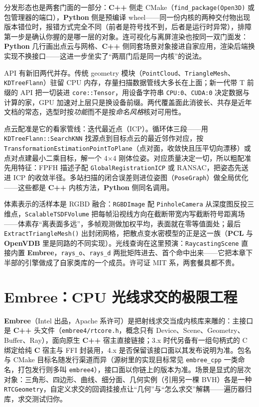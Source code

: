 \documentclass[12pt,a4paper,fontset=fandol]{ctexbook}
\newcommand{\Fn}[1]{\texttt{#1()}}
\newcommand{\Tp}[1]{\texttt{#1}}
\newcommand{\Bk}{\allowbreak}
\newcommand{\Lib}[1]{\textbf{#1}}
\newcommand{\Lang}[1]{\textsf{\bfseries #1}}
\newcommand{\CL}{\Lang{C}}
\newcommand{\CPP}{\Lang{C++}}
\newcommand{\PY}{\Lang{Python}}
\begin{document}
分发形态也是两套门面的一部分：\CPP{} 侧走 CMake（\Tp{find\_package(Open3D)} 或包管理器的端口），\PY{} 侧是预编译 wheel——同一份内核的两种交付物出现版本错位时，报错方式完全不同（前者是符号找不到，后者是运行时异常），排障第一步是确认你握的是哪一层的对象。连可视化与离屏渲染也按同一双门面发：\PY{} 几行画出点云与网格、\CPP{} 侧同套场景对象接进自家应用，渲染后端换实现不换接口——这进一步坐实了``两扇门后是同一内核''的说法。

API 有新旧两代并存。传统 geometry 模块（\Tp{PointCloud}、\Tp{TriangleMesh}、\Tp{KDTreeFlann}）驻留 CPU 内存，存量扫描数据管线大多长在上面；新一代带 T 前缀的 API 把一切装进 \Tp{core::Tensor}，用设备字符串 \Tp{CPU:0}、\Tp{CUDA:0} 决定数据与计算的家，GPU 加速对上层只是换设备前缀。两代覆盖面此消彼长、共存是近年文档的常态，选型时按\emph{功能}而不是按\emph{命名风格}核对可用性。

点云配准是它的看家管线：迭代最近点（ICP）。循环体三段——用 \Tp{KDTree{\Bk}Flann::\allowbreak SearchKNN} 找源点到目标点云的最近邻作对应，按 \Tp{Transformation\allowbreak Estimation\allowbreak Point{\Bk}To{\Bk}Plane}（点对面，收敛快且压平切向漂移）或点对点建最小二乘目标，解一个 4$\times$4 刚体位姿。对应质量决定一切，所以粗配准先用特征：FPFH 描述子配 \Tp{Global\allowbreak Registration\allowbreak ICP} 或 RANSAC，把姿态先送进 ICP 的收敛半径。多站扫描的闭合误差则进位姿图（\Tp{PoseGraph}）做全局优化——这些都是 \CPP{} 内核方法，\PY{} 侧同名调用。

体素表示的活样本是 RGBD 融合：\Tp{RGBDImage} 配 \Tp{PinholeCamera} 从深度图反投三维点，\Tp{ScalableTSDFVolume} 把每帧沿视线方向在截断带宽内写截断符号距离场——体素存``离表面多远''，多帧观测做加权平均，表面就在零等值面处；最后 \Fn{ExtractTriangleMesh} 出封闭网格，把散点变水密模型的正是这一族（\Lib{PCL} 与 \Lib{OpenVDB} 里是同路的不同实现）。光线查询在这里预演：\Tp{RaycastingScene} 直接内置 \Lib{Embree}，\Tp{rays\_o}、\Tp{rays\_d} 两批矩阵进去、首个命中出来——它把本章下半部的引擎做成了自家类库的一个成员。许可证 MIT 系，两套餐具都不贵。

\section{\Lib{Embree}：CPU 光线求交的极限工程}

\Lib{Embree}（Intel 出品，Apache 系许可）是把射线求交当成内核库来雕的：主接口是 \CPP{} 头文件（\Tp{embree4/rtcore.h}，概念只有 Device、Scene、Geometry、Buffer、Ray），面向原生 \CPP{} 宿主直接链接；3.x 时代另备有一组句柄式的 C 绑定给纯 \CL{} 宿主与 FFI 封装用，4.x 是否保留该接口面以其发布说明为准。包名与 CMake 目标名随发行渠道而异（源树里的实现目标常见 \Tp{embree\_cpp} 一类命名，打包发行则多叫 \Tp{embree4}），接口面以你链上的版本为准。场景是显式的层次对象：三角形、四边形、曲线、细分面、几何实例（引用另一棵 BVH）各是一种 \Tp{RTCGeometry}，自定义求交的回调挂接点让``几何''与``怎么求交''解耦——遍历器归库，求交测试归你。
\end{document}
